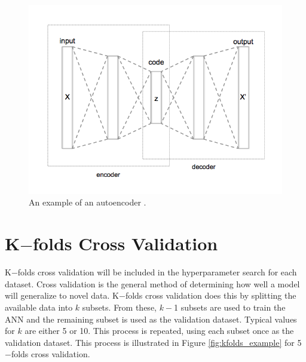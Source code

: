 \documentclass[tocnosub,noragright,centerchapter,12pt,fullpage]{uiucecethesis09}
\begin{document}
\begin{figure}[H]
\centering
\includegraphics[width=0.8\linewidth]{images/Autoencoder_structure}
\caption{An example of an autoencoder \cite{wiki:AutoencoderStructure}.}
\label{fig:Autoencoder_structure}
\end{figure}







\section{K$-$folds Cross Validation} \label{CrossValidation}

K$-$folds cross validation will be included in the hyperparameter search for each dataset. Cross validation is the general method of determining how well a model will generalize to novel data. K$-$folds cross validation does this by splitting the available data into $k$ subsets. From these, $k-$1 subsets are used to train the ANN and the remaining subset is used as the validation dataset. Typical values for $k$ are either 5 or 10. This process is repeated, using each subset once as the validation dataset. This process is illustrated in Figure \ref{fig:kfolds_example} for 5$-$folds cross validation. 
\end{document}
